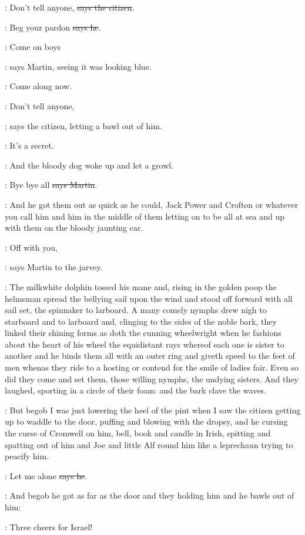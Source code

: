 \citizen:
Don't tell anyone, \sout{says the citizen}.

\Bloom:
Beg your pardon \sout{says he}.

\cunningham:
Come on boys

\Nq:
says Martin, seeing it was looking blue.

\cunningham:
Come along now.

\citizen:
Don't tell anyone,

\Nq:
says the citizen, letting a bawl out of him.

\citizen:
It's a secret.

\Nq:
And the bloody dog woke up and let a growl.

\cunningham:
Bye bye all \sout{says Martin}.

\Nq:
And he got them out as quick as he could, Jack Power and Crofton or
whatever you call him and him in the middle of them letting on to be all
at sea and up with them on the bloody jaunting car.

\cunningham:
Off with you,

\Nq:
says Martin to the jarvey.

:
The milkwhite dolphin tossed his mane and, rising in the golden poop
the helmsman spread the bellying sail upon the wind and stood off forward
with all sail set, the spinnaker to larboard. A many comely nymphs drew
nigh to starboard and to larboard and, clinging to the sides of the noble
bark, they linked their shining forms as doth the cunning wheelwright when
he fashions about the heart of his wheel the equidistant rays whereof each
one is sister to another and he binds them all with an outer ring and
giveth speed to the feet of men whenas they ride to a hosting or contend
for the smile of ladies fair. Even so did they come and set them, those
willing nymphs, the undying sisters. And they laughed, sporting in a
circle of their foam: and the bark clave the waves.

\Nq:
But begob I was just lowering the heel of the pint when I saw the
citizen getting up to waddle to the door, puffing and blowing with the
dropsy, and he cursing the curse of Cromwell on him, bell, book and candle
in Irish, spitting and spatting out of him and Joe and little Alf round
him like a leprechaun trying to peacify him.

\citizen:
Let me alone \sout{says he}.

\Nq:
And begob he got as far as the door and they holding him and he
bawls out of him:

\citizen:
Three cheers for Israel!

